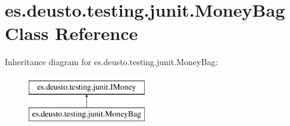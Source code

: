 \hypertarget{classes_1_1deusto_1_1testing_1_1junit_1_1_money_bag}{}\section{es.\+deusto.\+testing.\+junit.\+Money\+Bag Class Reference}
\label{classes_1_1deusto_1_1testing_1_1junit_1_1_money_bag}
Inheritance diagram for es.\+deusto.\+testing.\+junit.\+Money\+Bag\+:\begin{figure}[H]
\begin{center}
\leavevmode
\includegraphics[height=2.000000cm]{classes_1_1deusto_1_1testing_1_1junit_1_1_money_bag}
\end{center}
\end{figure}

